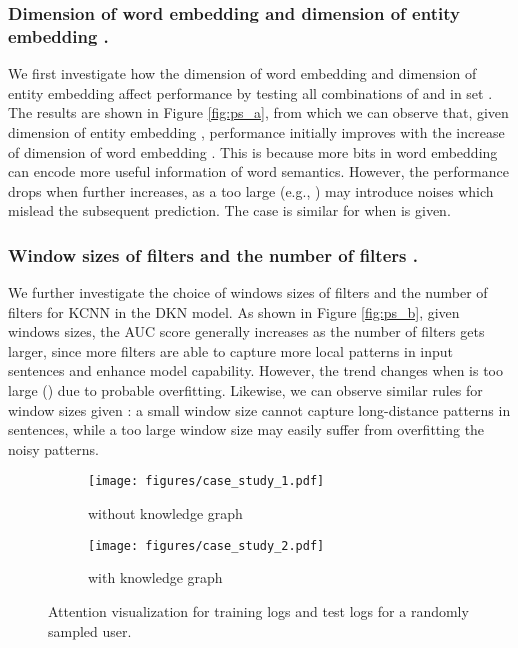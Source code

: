 \documentclass[sigconf]{acmart}
\begin{document}
		\subsubsection{Dimension of word embedding  and dimension of entity embedding .}
		We first investigate how the dimension of word embedding  and dimension of entity embedding  affect performance by testing all combinations of  and  in set .
		The results are shown in Figure \ref{fig:ps_a}, from which we can observe that, given dimension of entity embedding , performance initially improves with the increase of dimension of word embedding .
		This is because more bits in word embedding can encode more useful information of word semantics.
		However, the performance drops when  further increases, as a too large  (e.g., ) may introduce noises which mislead the subsequent prediction.
		The case is similar for  when  is given.
		
		\subsubsection{Window sizes of filters and the number of filters .}
		We further investigate the choice of windows sizes of filters and the number of filters for KCNN in the DKN model.
		As shown in Figure \ref{fig:ps_b}, given windows sizes, the AUC score generally increases as the number of filters  gets larger, since more filters are able to capture more local patterns in input sentences and enhance model capability.
		However, the trend changes when  is too large () due to probable overfitting.
		Likewise, we can observe similar rules for window sizes given : a small window size cannot capture long-distance patterns in sentences, while a too large window size may easily suffer from overfitting the noisy patterns.
		
		\begin{figure}[t]
			\centering
            \begin{subfigure}[b]{0.22\textwidth}
                \texttt{[image: figures/case\_study\_1.pdf]}
                \caption{without knowledge graph}
                \label{fig:cs_a}
            \end{subfigure}
            \hfill
            \begin{subfigure}[b]{0.22\textwidth}
                \texttt{[image: figures/case\_study\_2.pdf]}
                \caption{with knowledge graph}
                \label{fig:cs_b}
            \end{subfigure}
            \caption{Attention visualization for training logs and test logs for a randomly sampled user.}
            \label{fig:case_study}
            \vspace{-0.05in}
        \end{figure}
        	
\end{document}
